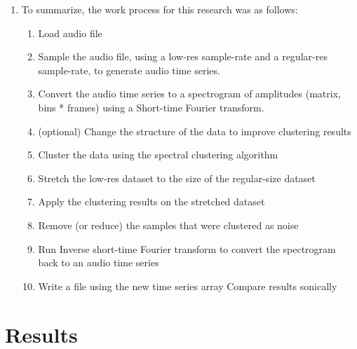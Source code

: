 \documentclass[10pt,twocolumn]{article}
\begin{document}
\begin{enumerate}
  \item To summarize, the work process for this research was as follows:
    \begin{enumerate}
      \item Load audio file
      \item Sample the audio file, using a low-res sample-rate and a regular-res sample-rate, to generate audio time series.
      \item Convert the audio time series to a spectrogram of amplitudes (matrix, bins * frames) using a Short-time Fourier transform.
      \item (optional) Change the structure of the data to improve clustering results
      \item Cluster the data using the spectral clustering algorithm
      \item Stretch the low-res dataset to the size of the regular-size dataset
      \item Apply the clustering results on the stretched dataset
      \item Remove (or reduce) the samples that were clustered as noise
      \item Run Inverse short-time Fourier transform to convert the spectrogram back to an audio time series
      \item Write a file using the new time series array Compare results sonically
    \end{enumerate}

\end{enumerate}

\section{Results}
\end{document}
